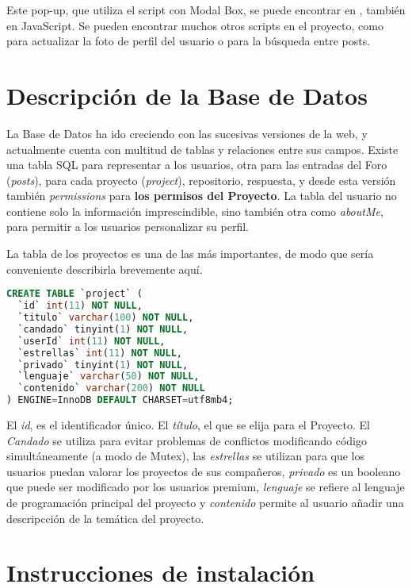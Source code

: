 \documentclass[12pt]{report}
\begin{document}
Este pop-up, que utiliza el script con Modal Box, se puede encontrar en , también en JavaScript. Se pueden encontrar muchos otros scripts en el proyecto, como  para actualizar la foto de perfil del usuario o  para la búsqueda entre posts.

\section{Descripción de la Base de Datos}

La Base de Datos ha ido creciendo con las sucesivas versiones de la web, y actualmente cuenta con multitud de tablas y relaciones entre sus campos. Existe una tabla SQL para representar a los usuarios, otra para las entradas del Foro (\textit{posts}), para cada proyecto (\textit{project}), repositorio, respuesta, y desde esta versión también \textit{permissions} para \textbf{los permisos del Proyecto}. La tabla del usuario no contiene solo la información imprescindible, sino también otra como \textit{aboutMe}, para permitir a los usuarios personalizar su perfil.

La tabla de los proyectos es una de las más importantes, de modo que sería conveniente describirla brevemente aquí.

\begin{lstlisting}[language=SQL]
CREATE TABLE `project` (
  `id` int(11) NOT NULL,
  `titulo` varchar(100) NOT NULL,
  `candado` tinyint(1) NOT NULL,
  `userId` int(11) NOT NULL,
  `estrellas` int(11) NOT NULL,
  `privado` tinyint(1) NOT NULL,
  `lenguaje` varchar(50) NOT NULL,
  `contenido` varchar(200) NOT NULL
) ENGINE=InnoDB DEFAULT CHARSET=utf8mb4;

\end{lstlisting}

El \textit{id}, es el identificador único. El \textit{título}, el que se elija para el Proyecto. El \textit{Candado} se utiliza para evitar problemas de conflictos modificando código simultáneamente (a modo de Mutex), las \textit{estrellas} se utilizan para que los usuarios puedan valorar los proyectos de sus compañeros, \textit{privado} es un booleano que puede ser modificado por los usuarios premium, \textit{lenguaje} se refiere al lenguaje de programación principal del proyecto y \textit{contenido} permite al usuario añadir una descripcción de la temática del proyecto.


\section{Instrucciones de instalación}
\end{document}

